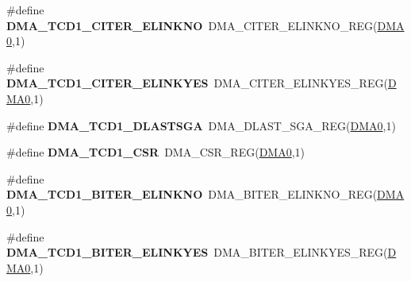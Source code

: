 \begin{DoxyCompactItemize}
\item 
\#define {\bfseries D\+M\+A\+\_\+\+T\+C\+D1\+\_\+\+C\+I\+T\+E\+R\+\_\+\+E\+L\+I\+N\+K\+NO}~D\+M\+A\+\_\+\+C\+I\+T\+E\+R\+\_\+\+E\+L\+I\+N\+K\+N\+O\+\_\+\+R\+EG(\hyperlink{group__DMA__Peripheral__Access__Layer_ga4103044f9ca209772f513dc694513ffb}{D\+M\+A0},1)\hypertarget{group__DMA__Register__Accessor__Macros_ga9e0483f14cbe1f3dbacf9b8047cf810d}{}\label{group__DMA__Register__Accessor__Macros_ga9e0483f14cbe1f3dbacf9b8047cf810d}

\item 
\#define {\bfseries D\+M\+A\+\_\+\+T\+C\+D1\+\_\+\+C\+I\+T\+E\+R\+\_\+\+E\+L\+I\+N\+K\+Y\+ES}~D\+M\+A\+\_\+\+C\+I\+T\+E\+R\+\_\+\+E\+L\+I\+N\+K\+Y\+E\+S\+\_\+\+R\+EG(\hyperlink{group__DMA__Peripheral__Access__Layer_ga4103044f9ca209772f513dc694513ffb}{D\+M\+A0},1)\hypertarget{group__DMA__Register__Accessor__Macros_ga93fe722e1649c6b4bc4c6bccecdda99f}{}\label{group__DMA__Register__Accessor__Macros_ga93fe722e1649c6b4bc4c6bccecdda99f}

\item 
\#define {\bfseries D\+M\+A\+\_\+\+T\+C\+D1\+\_\+\+D\+L\+A\+S\+T\+S\+GA}~D\+M\+A\+\_\+\+D\+L\+A\+S\+T\+\_\+\+S\+G\+A\+\_\+\+R\+EG(\hyperlink{group__DMA__Peripheral__Access__Layer_ga4103044f9ca209772f513dc694513ffb}{D\+M\+A0},1)\hypertarget{group__DMA__Register__Accessor__Macros_ga8e7ae95d1847471177772eff5d38b78b}{}\label{group__DMA__Register__Accessor__Macros_ga8e7ae95d1847471177772eff5d38b78b}

\item 
\#define {\bfseries D\+M\+A\+\_\+\+T\+C\+D1\+\_\+\+C\+SR}~D\+M\+A\+\_\+\+C\+S\+R\+\_\+\+R\+EG(\hyperlink{group__DMA__Peripheral__Access__Layer_ga4103044f9ca209772f513dc694513ffb}{D\+M\+A0},1)\hypertarget{group__DMA__Register__Accessor__Macros_gacad240efa4ab3711d61d1b82c5eedae2}{}\label{group__DMA__Register__Accessor__Macros_gacad240efa4ab3711d61d1b82c5eedae2}

\item 
\#define {\bfseries D\+M\+A\+\_\+\+T\+C\+D1\+\_\+\+B\+I\+T\+E\+R\+\_\+\+E\+L\+I\+N\+K\+NO}~D\+M\+A\+\_\+\+B\+I\+T\+E\+R\+\_\+\+E\+L\+I\+N\+K\+N\+O\+\_\+\+R\+EG(\hyperlink{group__DMA__Peripheral__Access__Layer_ga4103044f9ca209772f513dc694513ffb}{D\+M\+A0},1)\hypertarget{group__DMA__Register__Accessor__Macros_ga898031f3c7ec06acd31e0daee2d983d3}{}\label{group__DMA__Register__Accessor__Macros_ga898031f3c7ec06acd31e0daee2d983d3}

\item 
\#define {\bfseries D\+M\+A\+\_\+\+T\+C\+D1\+\_\+\+B\+I\+T\+E\+R\+\_\+\+E\+L\+I\+N\+K\+Y\+ES}~D\+M\+A\+\_\+\+B\+I\+T\+E\+R\+\_\+\+E\+L\+I\+N\+K\+Y\+E\+S\+\_\+\+R\+EG(\hyperlink{group__DMA__Peripheral__Access__Layer_ga4103044f9ca209772f513dc694513ffb}{D\+M\+A0},1)\hypertarget{group__DMA__Register__Accessor__Macros_ga0484b8606e5656a358ba3a3a1e7f7623}{}\label{group__DMA__Register__Accessor__Macros_ga0484b8606e5656a358ba3a3a1e7f7623}


\end{DoxyCompactItemize}
